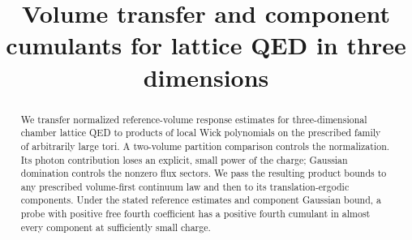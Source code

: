 \documentclass[11pt,letterpaper,reqno]{amsart}
\title[Volume transfer and component cumulants]{Volume transfer and component cumulants for lattice QED in three dimensions}
\date{}
\begin{document}
\begin{abstract}
We transfer normalized reference-volume response estimates for
three-dimensional chamber lattice QED to products of local Wick
polynomials on the prescribed family of arbitrarily large tori.
A two-volume partition comparison controls the normalization.
Its photon contribution loses an explicit, small power of the charge;
Gaussian domination controls the nonzero flux sectors.
We pass the resulting product bounds to any prescribed volume-first
continuum law and then to its translation-ergodic components.
Under the stated reference estimates and component Gaussian bound,
a probe with positive free fourth coefficient has a positive fourth
cumulant in almost every component at sufficiently small charge.
\end{abstract}
\maketitle
\tableofcontents








\printbibliography
\end{document}
